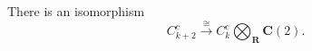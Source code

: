There is an isomorphism
$$C_{k+2}^c \xrightarrow{\cong} C_k^c \bigotimes_{\mathbf{R}} \mathbf{C}(2).$$

